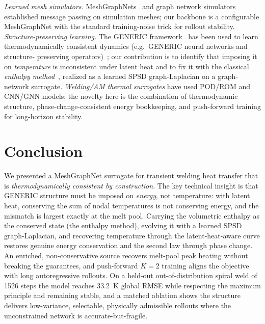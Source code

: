 \documentclass[11pt]{article}
\theoremstyle{definition}
\begin{document}
\emph{Learned mesh simulators.} MeshGraphNets~\cite{pfaff2021learning} and graph network
simulators~\cite{sanchez2020learning} established message passing on simulation meshes;
our backbone is a configurable MeshGraphNet with the standard training-noise trick for
rollout stability. \emph{Structure-preserving learning.} The GENERIC
framework~\cite{grmela1997dynamics,ottinger2005beyond} has been used to learn
thermodynamically consistent dynamics (e.g.\ GENERIC neural networks and structure-
preserving operators)~\cite{hernandez2021structure}; our contribution is to identify
that imposing it on \emph{temperature} is inconsistent under latent heat and to fix it
with the classical \emph{enthalpy method}~\cite{voller1987enthalpy}, realized as a
learned SPSD graph-Laplacian on a graph-network surrogate. \emph{Welding/AM thermal
surrogates} have used POD/ROM and CNN/GNN models; the novelty here is the combination of
thermodynamic structure, phase-change-consistent energy bookkeeping, and push-forward
training for long-horizon stability.

\section{Conclusion}

We presented a MeshGraphNet surrogate for transient welding heat transfer that is
\emph{thermodynamically consistent by construction}. The key technical insight is that
GENERIC structure must be imposed on \emph{energy}, not temperature: with latent heat,
conserving the sum of nodal temperatures is not conserving energy, and the mismatch is
largest exactly at the melt pool. Carrying the volumetric enthalpy as the conserved
state (the enthalpy method), evolving it with a learned SPSD graph-Laplacian, and
recovering temperature through the latent-heat-aware curve restores genuine energy
conservation and the second law through phase change. An enriched, non-conservative
source recovers melt-pool peak heating without breaking the guarantees, and push-forward
$K{=}2$ training aligns the objective with long autoregressive rollouts. On a held-out
out-of-distribution spiral weld of \num{1526} steps the model reaches \SI{33.2}{K} global
RMSE while respecting the maximum principle and remaining stable, and a matched ablation
shows the structure delivers low-variance, selectable, physically admissible rollouts
where the unconstrained network is accurate-but-fragile.
\end{document}
